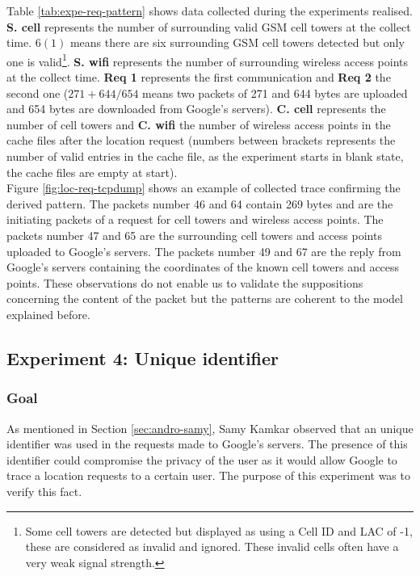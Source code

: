 Table \ref{tab:expe-req-pattern} shows data collected during the experiments realised.
\textbf{S. cell} represents the number of surrounding valid GSM cell towers at the collect time.
$6 (1)$ means there are six surrounding GSM cell towers detected but only one is valid\footnote{Some cell towers are detected but displayed as using a Cell ID and LAC of -1, these are considered as invalid and ignored. These invalid cells often have a very weak signal strength.}.
\textbf{S. wifi} represents the number of surrounding wireless access points at the collect time.
\textbf{Req 1} represents the first communication and \textbf{Req 2} the second one ($271+644/654$ means two packets of 271 and 644 bytes are uploaded and 654 bytes are downloaded from Google's servers).
\textbf{C. cell} represents the number of cell towers and \textbf{C. wifi} the number of wireless access points in the cache files after the location request (numbers between brackets represents the number of valid entries in the cache file, as the experiment starts in blank state, the cache files are empty at start).\\


Figure \ref{fig:loc-req-tcpdump} shows an example of collected trace confirming the derived pattern.
The packets number 46 and 64 contain 269 bytes and are the initiating packets of a request for cell towers and wireless access points.
The packets number 47 and 65 are the surrounding cell towers and access points uploaded to Google's servers.
The packets number 49 and 67 are the reply from Google's servers containing the coordinates of the known cell towers and access points.
These observations do not enable us to validate the suppositions concerning the content of the packet but the patterns are coherent to the model explained before.

\subsection{Experiment 4: Unique identifier}

\subsubsection{Goal}

As mentioned in Section \ref{sec:andro-samy}, Samy Kamkar observed that an unique identifier was used in the requests made to Google's servers.
The presence of this identifier could compromise the privacy of the user as it would allow Google to trace a location requests to a certain user.
The purpose of this experiment was to verify this fact.

